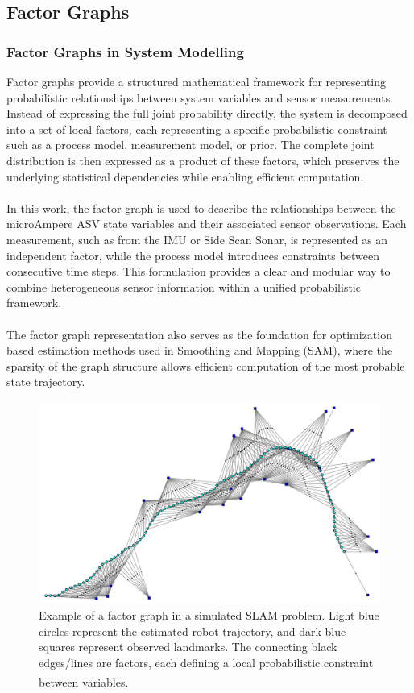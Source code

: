 \subsection{Factor Graphs}
\subsubsection{Factor Graphs in System Modelling}
Factor graphs provide a structured mathematical framework for representing probabilistic relationships between system variables and sensor measurements. Instead of expressing the full joint probability directly, the system is decomposed into a set of local factors, each representing a specific probabilistic constraint such as a process model, measurement model, or prior. The complete joint distribution is then expressed as a product of these factors, which preserves the underlying statistical dependencies while enabling efficient computation.  
\\ \\
In this work, the factor graph is used to describe the relationships between the microAmpere ASV state variables and their associated sensor observations. Each measurement, such as from the IMU or Side Scan Sonar, is represented as an independent factor, while the process model introduces constraints between consecutive time steps. 
This formulation provides a clear and modular way to combine heterogeneous sensor information within a unified probabilistic framework.  
\\ \\
The factor graph representation also serves as the foundation for optimization based estimation methods used in Smoothing and Mapping (SAM), where the sparsity of the graph structure allows efficient computation of the most probable state trajectory.

\begin{figure}[H]
    \centering
    \includegraphics[width=0.9\linewidth]{Pictures/System_Modeling/Factor_Graphs/Example.png}
    \caption{Example of a factor graph in a simulated SLAM problem. Light blue circles represent the estimated robot trajectory, and dark blue squares represent observed landmarks. The connecting black edges/lines are factors, each defining a local probabilistic constraint between variables.\textsuperscript{\cite{factor_graphs}}}
    \label{fig:system-modeling-factor-graph-example}
\end{figure}

